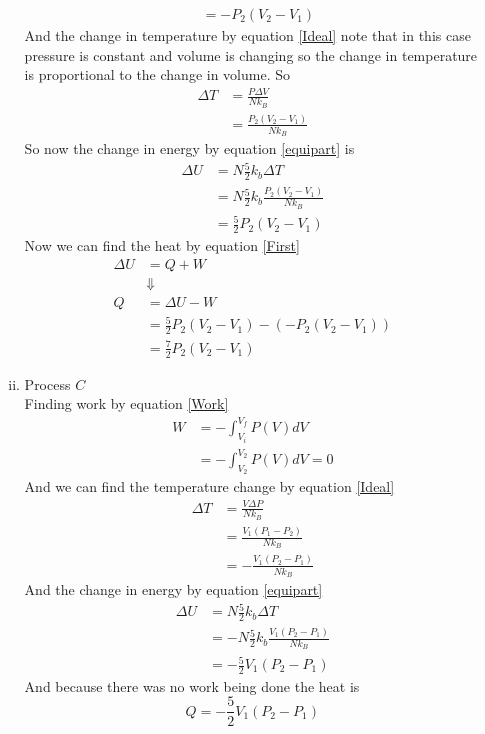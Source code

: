 \documentclass[11pt]{article}
\numberwithin{equation}{section}
\begin{document}
\begin{enumerate}[(a)]
\begin{enumerate}[(i)]
\begin{align*}
&= -P_2(V_2 -V_1)
\end{align*}
And the change in temperature by equation \ref{Ideal} note that in this case pressure is constant and volume is changing so the change in temperature is proportional to the change in volume. So
\begin{align*}
\Delta T &= \frac{P\Delta V}{Nk_B}\\
&= \frac{P_2(V_2-V_1)}{Nk_B}
\end{align*}
So now the change in energy by equation \ref{equipart} is
\begin{align*}
\Delta U &= N\frac{5}{2}k_b\Delta T\\
&= N\frac{5}{2}k_b\frac{P_2(V_2-V_1)}{Nk_B}\\
&= \frac{5}{2}P_2(V_2-V_1)
\end{align*}
Now we can find the heat by equation \ref{First}
\begin{align*}
\Delta U &= Q+W\\
&\Downarrow\\
Q &= \Delta U - W\\
&= \frac{5}{2}P_2(V_2-V_1) - (-P_2(V_2 -V_1))\\
&= \frac{7}{2}P_2(V_2-V_1)
\end{align*}

\item Process $C$ \\
Finding work by equation \ref{Work}
\begin{align*}
W &= -\int_{V_i}^{V_f}P(V)dV\\
&= -\int_{V_2}^{V_2}P(V)dV = 0
\end{align*}
And we can find the temperature change by equation \ref{Ideal} 
\begin{align*}
\Delta T &= \frac{V\Delta P}{Nk_B}\\
&= \frac{V_1(P_1-P_2)}{Nk_B}\\
&= -\frac{V_1(P_2-P_1)}{Nk_B}
\end{align*}
And the change in energy by equation \ref{equipart}
\begin{align*}
\Delta U &= N\frac{5}{2}k_b\Delta T\\
&= -N\frac{5}{2}k_b\frac{V_1(P_2-P_1)}{Nk_B}\\
&= -\frac{5}{2}V_1(P_2-P_1)
\end{align*}
And because there was no work being done the heat is
$$Q = -\frac{5}{2}V_1(P_2-P_1)$$


\end{enumerate}
\end{enumerate}
\end{document}
